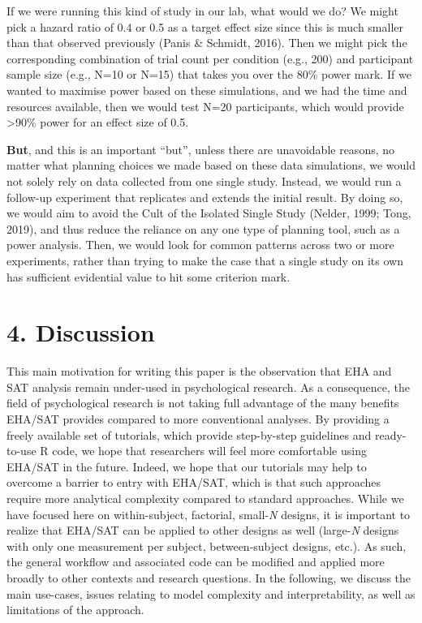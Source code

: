 \documentclass[
  man, donotrepeattitle,floatsintext]{apa6}
\begin{document}
If we were running this kind of study in our lab, what would we do?
We might pick a hazard ratio of 0.4 or 0.5 as a target effect size since this is much smaller than that observed previously (Panis \& Schmidt, 2016).
Then we might pick the corresponding combination of trial count per condition (e.g., 200) and participant sample size (e.g., N=10 or N=15) that takes you over the 80\% power mark.
If we wanted to maximise power based on these simulations, and we had the time and resources available, then we would test N=20 participants, which would provide \textgreater90\% power for an effect size of 0.5.

\textbf{But}, and this is an important ``but'', unless there are unavoidable reasons, no matter what planning choices we made based on these data simulations, we would not solely rely on data collected from one single study.
Instead, we would run a follow-up experiment that replicates and extends the initial result.
By doing so, we would aim to avoid the Cult of the Isolated Single Study (Nelder, 1999; Tong, 2019), and thus reduce the reliance on any one type of planning tool, such as a power analysis.
Then, we would look for common patterns across two or more experiments, rather than trying to make the case that a single study on its own has sufficient evidential value to hit some criterion mark.

\section{4. Discussion}\label{discussion}

This main motivation for writing this paper is the observation that EHA and SAT analysis remain under-used in psychological research. As a consequence, the field of psychological research is not taking full advantage of the many benefits EHA/SAT provides compared to more conventional analyses. By providing a freely available set of tutorials, which provide step-by-step guidelines and ready-to-use R code, we hope that researchers will feel more comfortable using EHA/SAT in the future. Indeed, we hope that our tutorials may help to overcome a barrier to entry with EHA/SAT, which is that such approaches require more analytical complexity compared to standard approaches. While we have focused here on within-subject, factorial, small-\emph{N} designs, it is important to realize that EHA/SAT can be applied to other designs as well (large-\emph{N} designs with only one measurement per subject, between-subject designs, etc.). As such, the general workflow and associated code can be modified and applied more broadly to other contexts and research questions. In the following, we discuss the main use-cases, issues relating to model complexity and interpretability, as well as limitations of the approach.
\end{document}
